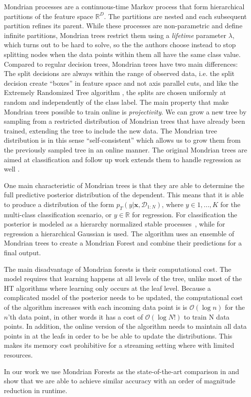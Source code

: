Mondrian processes are a continuous-time
Markov process that form hierarchical partitions of the feature space $\mathbb{R}^D$.
The partitions are nested and each subsequent partition refines its parent. While
these processes are non-parametric and define infinite partitions, Mondrian trees
restrict them using a \emph{lifetime} parameter $\lambda$, which turns out to be hard to solve,
so the the authors choose instead to stop splitting nodes when the data points
within them all have the same class value. Compared to regular decision trees,
Mondrian trees have two main differences: The split decisions are always within
the range of observed data, i.e. the split decision create ``boxes'' in feature
space and not axis parallel cuts, and like the Extremely Randomized Tree algorithm
\cite{ert}, the splits are chosen uniformly at random and independently of the
class label. The main property that make Mondrian trees possible to train
online is \emph{projectivity}. We can grow a new tree by sampling from a restricted
distribution of Mondrian trees that have already been trained, extending the tree
to include the new data. The Mondrian tree distribution is in this sense ``self-consistent''
\cite{mondrian-forests-original} which allows us to grow them from the previously
sampled tree in an online manner. The original Mondrian trees are aimed at classification
and follow up work extends them to handle regression as well \cite{mondrian-forests-regression}.

One main characteristic of Mondrian trees is that they are able to determine the full
predictive posterior distribution of the dependent. This means that it is able to
produce a distribution of the form $p_T(y |\mathbf{x}, \mathcal{D}_{1:N})$, where
$y \in {1,..., K}$ for the multi-class classification scenario, or $y \in \mathbb{R}$
for regression. For classification the posterior is modeled as a hierarchy
normalized stable processes~\cite{nsp}, while for regression a hierarchical Gaussian is used.
The algorithm uses an ensemble of Mondrian trees to create a Mondrian Forest and combine
their predictions for a final output.

The main disadvantage of Mondrian forests is their computational cost. The model
requires that learning happens at all levels of the tree, unlike most of the HT
algorithms where learning only occurs at the leaf level. Because a complicated
model of the posterior needs to be updated, the computational cost of the algorithm
increases with each incoming data point is is $\mathcal{O}(\log n)$ for the $n$'th
data point, in other words it has a cost of $\mathcal{O}(\log N!)$ to train N
data points. In addition, the online version of the algorithm needs to maintain
all data points in at the leafs in order to be be able to update the distributions.
This makes its memory cost prohibitive for a streaming setting where with limited resources.

In our work we use Mondrian Forests as the state-of-the-art comparison in \uncertaintrees
and show that we are able to achieve similar accuracy with an order of magnitude reduction
in runtime.
